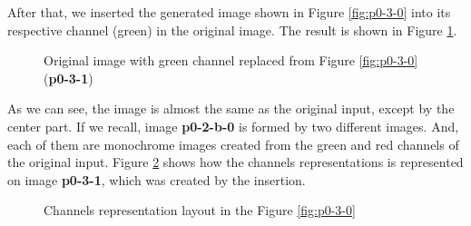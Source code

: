 \documentclass[12pt,a4paper]{article}
\begin{document}
After that, we inserted the generated image shown in Figure \ref{fig:p0-3-0} into its respective channel (green) in the original image. The result is shown in Figure \ref{fig:p0-3-1}.

\begin{figure}[!h]
	\centering
	{%
		\setlength{\fboxsep}{1pt}%
		\setlength{\fboxrule}{1pt}%
	}%
	\caption{Original image with green channel replaced from Figure \ref{fig:p0-3-0} (\textbf{p0-3-1})}
	\label{fig:p0-3-1}
\end{figure}

As we can see, the image is almost the same as the original input, except by the center part. If we recall, image \textbf{p0-2-b-0} is formed by two different images. And, each of them are monochrome images created from the green and red channels of the original input. Figure \ref{fig:channels} shows how the channels representations is represented on image \textbf{p0-3-1}, which was created by the insertion. \\

\begin{figure}[!h]
	\centering
	{%
		\setlength{\fboxsep}{1pt}%
		\setlength{\fboxrule}{1pt}%
	}%
	\caption{Channels representation layout in the Figure \ref{fig:p0-3-0}}
	\label{fig:channels}
\end{figure}
\end{document}
